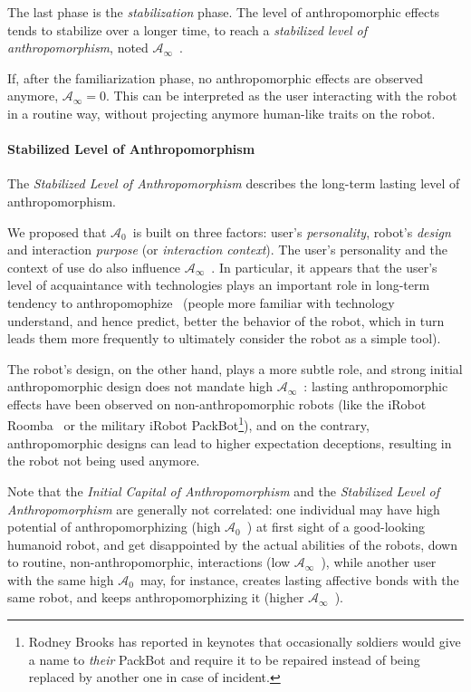 \documentclass{frontiersSCNS} %
\newcommand{\ICA}{{$\mathcal{A}_0$~}}
\newcommand{\SLA}{{$\mathcal{A}_\infty$~}}
\newcommand{\sla}{{\mathcal{A}_\infty}}
\begin{document}
The last phase is the \emph{stabilization} phase. The level of anthropomorphic
effects tends to stabilize over a longer time, to reach a \emph{stabilized
level of anthropomorphism}, noted \SLA.

If, after the familiarization phase, no anthropomorphic effects are observed
anymore, $\sla = 0$. This can be interpreted as the user interacting with the
robot in a routine way, without projecting anymore human-like traits on the
robot.


\paragraph{Stabilized Level of Anthropomorphism}

The \emph{Stabilized Level of Anthropomorphism} describes the long-term lasting level of
anthropomorphism.

We proposed that \ICA is built on three factors: user's \emph{personality},
robot's \emph{design} and interaction \emph{purpose} (or \emph{interaction
context}). The user's personality and the context of use do also influence \SLA.
In particular, it appears that the user's level of acquaintance with
technologies plays an important role in long-term tendency to
anthropomophize~\cite{fink_living_2013} (people more familiar with technology
understand, and hence predict, better the behavior of the robot, which in turn
leads them more frequently to ultimately consider the robot as a simple tool).

The robot's design, on the other hand, plays a more subtle role, and strong
initial anthropomorphic design does not mandate high \SLA: lasting
anthropomorphic effects have been observed on non-anthropomorphic robots (like
the iRobot Roomba~\cite{fink_living_2013} or the military iRobot
PackBot\footnote{Rodney Brooks has reported in keynotes that occasionally
soldiers would give a name to \emph{their} PackBot and require it to be repaired
instead of being replaced by another one in case of incident.}), and on the
contrary, anthropomorphic designs can lead to higher expectation deceptions,
resulting in the robot not being used anymore.

Note that the \emph{Initial Capital of Anthropomorphism} and the
\emph{Stabilized Level of Anthropomorphism} are generally not correlated: one
individual may have high potential of anthropomorphizing (high \ICA) at first
sight of a good-looking humanoid robot, and get disappointed by the actual
abilities of the robots, down to routine, non-anthropomorphic, interactions (low
\SLA), while another user with the same high \ICA may, for instance, creates
lasting affective bonds with the same robot, and keeps anthropomorphizing it
(higher \SLA).
\end{document}
